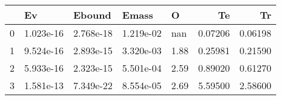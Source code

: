 \begin{tabular}{lllllrr}
\toprule
{} &         Ev &     Ebound &      Emass &     O &       Te &       Tr \\
\midrule
0 &  1.023e-16 &  2.768e-18 &  1.219e-02 &   nan &  0.07206 &  0.06198 \\
1 &  9.524e-16 &  2.893e-15 &  3.320e-03 &  1.88 &  0.25981 &  0.21590 \\
2 &  5.933e-16 &  2.323e-15 &  5.501e-04 &  2.59 &  0.89020 &  0.61270 \\
3 &  1.581e-13 &  7.349e-22 &  8.554e-05 &  2.69 &  5.59500 &  2.58600 \\
\bottomrule
\end{tabular}
